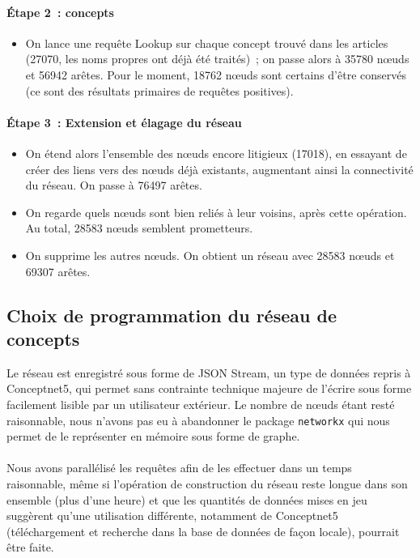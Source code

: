 \documentclass[a4paper, 12pt]{article}
\newcommand{\pyt}[1]{\texttt{#1}}%
\begin{document}
\paragraph{Étape 2~: concepts}

\begin{itemize}
 \item On lance une requête Lookup sur chaque concept trouvé dans les articles (27070, les noms propres ont déjà été traités)~; on passe alors à 35780 n\oe{}uds et 56942 arêtes. Pour le moment, 18762 n\oe{}uds sont certains d'être conservés (ce sont des résultats primaires de requêtes positives).
\end{itemize}


\paragraph{Étape 3~: Extension et élagage du réseau}

\begin{itemize}
 \item On étend alors l'ensemble des n\oe{}uds encore litigieux (17018), en essayant de créer des liens vers des n\oe{}uds déjà existants, augmentant ainsi la connectivité du réseau. On passe à 76497 arêtes.
 \item On regarde quels n\oe{}uds sont bien reliés à leur voisins, après cette opération. Au total, 28583 n\oe{}uds semblent prometteurs.
 \item On supprime les autres n\oe{}uds. On obtient un réseau avec 28583 n\oe{}uds et 69307 arêtes.
\end{itemize}



\subsection{Choix de programmation du réseau de concepts}

Le réseau est enregistré sous forme de JSON Stream, un type de données repris à Conceptnet5, qui permet sans contrainte technique majeure de l'écrire sous forme facilement lisible par un utilisateur extérieur. Le nombre de nœuds étant resté raisonnable, nous n'avons pas eu à abandonner le package \pyt{networkx} qui nous permet de le représenter en mémoire sous forme de graphe.

\paragraph{}
Nous avons parallélisé les requêtes afin de les effectuer dans un temps raisonnable, même si l'opération de construction du réseau reste longue dans son ensemble (plus d'une heure) et que les quantités de données mises en jeu suggèrent qu'une utilisation différente, notamment de Conceptnet5 (téléchargement et recherche dans la base de données de façon locale), pourrait être faite.
\end{document}
